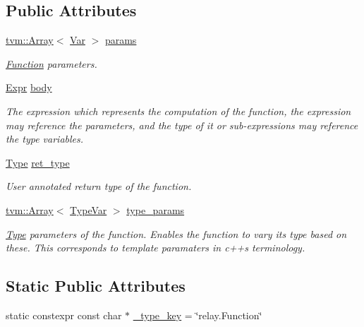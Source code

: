 \subsection*{Public Attributes}
\begin{DoxyCompactItemize}
\item 
\hyperlink{classtvm_1_1Array}{tvm\+::\+Array}$<$ \hyperlink{classtvm_1_1relay_1_1Var}{Var} $>$ \hyperlink{classtvm_1_1relay_1_1FunctionNode_a689c5078fb501798aa1d57d1825e3b5a}{params}
\begin{DoxyCompactList}\small\item\em \hyperlink{classtvm_1_1relay_1_1Function}{Function} parameters. \end{DoxyCompactList}\item 
\hyperlink{namespacetvm_1_1relay_a5b84e3790f89bb3fad5c7911eeb99531}{Expr} \hyperlink{classtvm_1_1relay_1_1FunctionNode_a32687067886a6d94e798431a01d04949}{body}
\begin{DoxyCompactList}\small\item\em The expression which represents the computation of the function, the expression may reference the parameters, and the type of it or sub-\/expressions may reference the type variables. \end{DoxyCompactList}\item 
\hyperlink{namespacetvm_1_1relay_a661d95f170bca230773914caeef3fe52}{Type} \hyperlink{classtvm_1_1relay_1_1FunctionNode_a075bcae369d873c24b7887eb7c96da40}{ret\+\_\+type}
\begin{DoxyCompactList}\small\item\em User annotated return type of the function. \end{DoxyCompactList}\item 
\hyperlink{classtvm_1_1Array}{tvm\+::\+Array}$<$ \hyperlink{namespacetvm_1_1relay_a63321eb51080f3f57dd7563a3ca0bfa6}{Type\+Var} $>$ \hyperlink{classtvm_1_1relay_1_1FunctionNode_a558ecb3ab57111b1a0f347764054d5e1}{type\+\_\+params}
\begin{DoxyCompactList}\small\item\em \hyperlink{classtvm_1_1Type}{Type} parameters of the function. Enables the function to vary its type based on these. This corresponds to template paramaters in c++\textquotesingle{}s terminology. \end{DoxyCompactList}\end{DoxyCompactItemize}
\subsection*{Static Public Attributes}
\begin{DoxyCompactItemize}
\item 
static constexpr const char $\ast$ \hyperlink{classtvm_1_1relay_1_1FunctionNode_a75dd6eaa948a6bfc802686999428bfef}{\+\_\+type\+\_\+key} = \char`\"{}relay.\+Function\char`\"{}
\end{DoxyCompactItemize}


